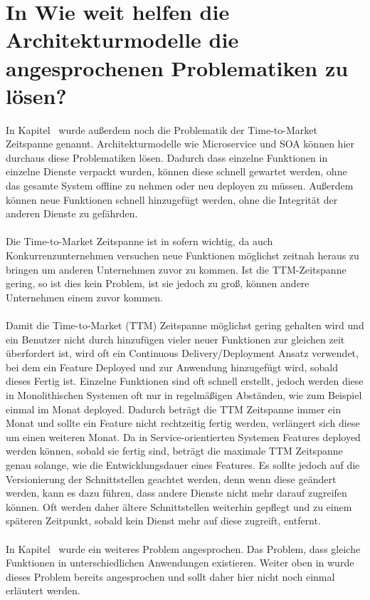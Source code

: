 \section{In Wie weit helfen die Architekturmodelle die angesprochenen Problematiken zu lösen?}
\label{sec:LoesungDerProblematiken}
In Kapitel \ wurde außerdem noch die Problematik der Time-to-Market Zeitspanne genannt. Architekturmodelle wie Microservice und SOA können hier durchaus diese Problematiken lösen. Dadurch dass einzelne Funktionen in einzelne Dienste verpackt wurden, können diese schnell gewartet werden, ohne das gesamte System offline zu nehmen oder neu deployen zu müssen. Außerdem können neue Funktionen schnell hinzugefügt werden, ohne die Integrität der anderen Dienste zu gefährden.
\\\\
Die Time-to-Market Zeitspanne ist in sofern wichtig, da auch Konkurrenzunternehmen versuchen neue Funktionen möglichst zeitnah heraus zu bringen um anderen Unternehmen zuvor zu kommen. Ist die TTM-Zeitspanne gering, so ist dies kein Problem, ist sie jedoch zu groß, können andere Unternehmen einem zuvor kommen.
\\\\
Damit die Time-to-Market (TTM) Zeitspanne möglichst gering gehalten wird und ein Benutzer nicht durch hinzufügen vieler neuer Funktionen zur gleichen zeit überfordert ist, wird oft ein Continuous Delivery/Deployment Ansatz verwendet, bei dem ein Feature Deployed und zur Anwendung hinzugefügt wird, sobald dieses Fertig ist. Einzelne Funktionen sind oft schnell erstellt, jedoch werden diese in Monolithischen Systemen oft nur in regelmäßigen Abständen, wie zum Beispiel einmal im Monat deployed. Dadurch beträgt die TTM Zeitspanne immer ein Monat und sollte ein Feature nicht rechtzeitig fertig werden, verlängert sich diese um einen weiteren Monat. Da in Service-orientierten Systemen Features deployed werden können, sobald sie fertig sind, beträgt die maximale TTM Zeitspanne genau solange, wie die Entwicklungsdauer eines Features. Es sollte jedoch auf die Versionierung der Schnittstellen geachtet werden, denn wenn diese geändert werden, kann es dazu führen, dass andere Dienste nicht mehr darauf zugreifen können. Oft werden daher ältere Schnittstellen weiterhin gepflegt und zu einem späteren Zeitpunkt, sobald kein Dienst mehr auf diese zugreift, entfernt.
\\\\
In Kapitel \ wurde ein weiteres Problem angesprochen. Das Problem, dass gleiche Funktionen in unterschiedlichen Anwendungen existieren. Weiter oben in  wurde dieses Problem bereits angesprochen und sollt daher hier nicht noch einmal erläutert werden.

